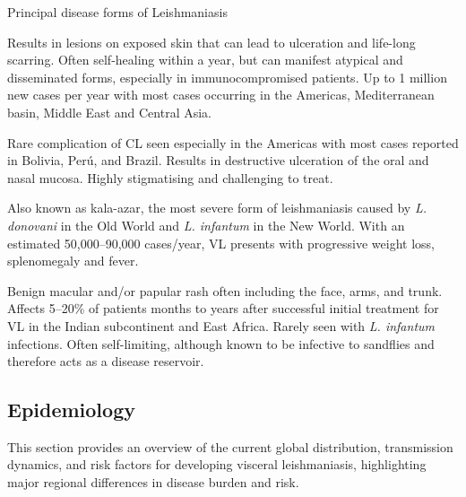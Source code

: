 \begin{mybox}[label=box:main-four]{Principal disease forms of Leishmaniasis\cite{who_leish,farrar2023manson}}
  \begin{description}[nosep]
    \item[Cutaneous leishmaniasis (CL)] Results in lesions on exposed skin that can lead to ulceration and life-long scarring. Often self-healing within a year, but can manifest atypical and disseminated forms, especially in immunocompromised patients. Up to 1 million new cases per year with most cases occurring in the Americas, Mediterranean basin, Middle East and Central Asia.
    \item[Mucocutaneous leishmaniasis (MCL)] Rare complication of CL seen especially in the Americas with most cases reported in Bolivia, Perú, and Brazil. Results in destructive ulceration of the oral and nasal mucosa. Highly stigmatising and challenging to treat.
    \item[Visceral leishmaniasis (VL)] Also known as kala-azar, the most severe form of leishmaniasis caused by \textit{L. donovani} in the Old World and \textit{L. infantum} in the New World. With an estimated 50,000--90,000 cases/year, VL presents with progressive weight loss, splenomegaly and fever.
    \item[Post kala--azar dermal leishmaniasis (PKDL)] Benign macular and/or papular rash often including the face, arms, and trunk.  Affects 5--20\% of patients months to years after successful initial treatment for VL in the Indian subcontinent and East Africa. Rarely seen with \textit{L. infantum} infections. Often self-limiting, although known to be infective to sandflies and therefore acts as a disease reservoir.
  \end{description}
\end{mybox}

\subsection{Epidemiology}

This section provides an overview of the current global distribution, transmission dynamics, and risk factors for developing visceral leishmaniasis, highlighting major regional differences in disease burden and risk.

